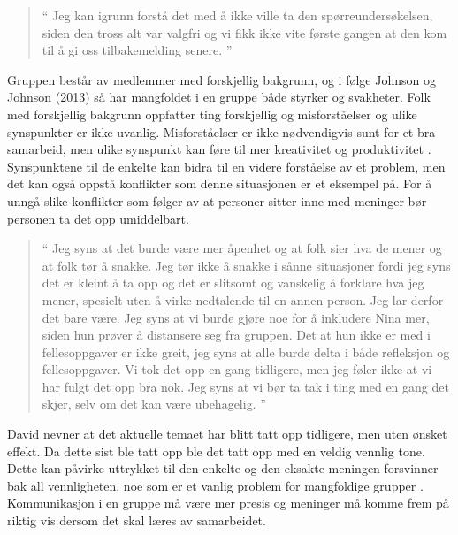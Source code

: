 \begin{quote}``
Jeg kan igrunn forstå det med å ikke ville ta den spørreundersøkelsen, siden den 
tross alt var valgfri og vi fikk ikke vite første gangen at den kom til å gi oss tilbakemelding senere.
''\end{quote} 

Gruppen består av medlemmer med forskjellig bakgrunn, og i følge Johnson og Johnson (2013) så har mangfoldet i en gruppe 
både styrker og svakheter. Folk med forskjellig bakgrunn oppfatter ting forskjellig og misforståelser og ulike synspunkter er 
ikke uvanlig. Misforståelser er ikke nødvendigvis sunt for et bra samarbeid, men ulike synspunkt kan føre til mer kreativitet 
og produktivitet \cite{Artikkel2}. Synspunktene til de enkelte kan bidra til en videre forståelse av et problem, men det kan også oppstå 
konflikter som denne situasjonen er et eksempel på.
For å unngå slike konflikter som følger av at personer sitter inne med meninger bør personen ta det opp umiddelbart.

\begin{quote}``
Jeg syns at det burde være mer åpenhet og at folk sier hva de 
mener og at folk tør å snakke. Jeg tør ikke å snakke i sånne situasjoner fordi jeg syns det er kleint å ta opp og det 
er slitsomt og vanskelig å forklare hva jeg mener, spesielt uten å virke nedtalende til en annen person. Jeg lar derfor
det bare være. Jeg syns at vi burde gjøre noe for å inkludere Nina mer, siden hun prøver å distansere seg fra gruppen. 
Det at hun ikke er med i fellesoppgaver er ikke greit, jeg syns at alle burde delta i både refleksjon og 
fellesoppgaver. Vi tok det opp en gang tidligere, men jeg føler ikke at vi har fulgt det opp bra nok. Jeg syns at vi bør 
ta tak i ting med en gang det skjer, selv om det kan være ubehagelig.
''\end{quote} 

David nevner at det aktuelle temaet har blitt tatt opp tidligere, men uten ønsket effekt. Da dette sist ble tatt opp ble
det tatt opp med en veldig vennlig tone. Dette kan påvirke uttrykket til den enkelte og den eksakte meningen 
forsvinner bak all vennligheten, noe som er et vanlig problem for mangfoldige grupper \cite{Artikkel2}. 
Kommunikasjon i en gruppe må være mer presis og meninger må komme frem på
riktig vis dersom det skal læres av samarbeidet.  

